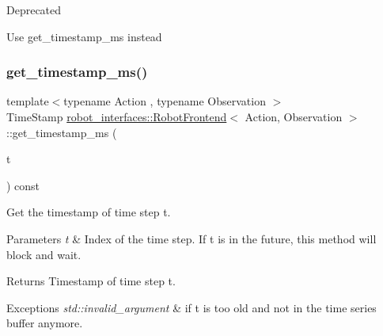 \begin{DoxyRefDesc}{Deprecated}
\item[\hyperlink{deprecated__deprecated000001}{Deprecated}]Use get\+\_\+timestamp\+\_\+ms instead \end{DoxyRefDesc}
\mbox{\label{classrobot__interfaces_1_1RobotFrontend_a6ad481cd306ea4fc2739dc9aba4cb96a}} 
\subsubsection{\texorpdfstring{get\+\_\+timestamp\+\_\+ms()}{get\_timestamp\_ms()}}
{\footnotesize\ttfamily template$<$typename Action , typename Observation $>$ \\
Time\+Stamp \hyperlink{classrobot__interfaces_1_1RobotFrontend}{robot\+\_\+interfaces\+::\+Robot\+Frontend}$<$ Action, Observation $>$\+::get\+\_\+timestamp\+\_\+ms (\begin{DoxyParamCaption}\item[{const Time\+Index \&}]{t }\end{DoxyParamCaption}) const\hspace{0.3cm}{\ttfamily [inline]}}



Get the timestamp of time step t. 


\begin{DoxyParams}{Parameters}
{\em t} & Index of the time step. If t is in the future, this method will block and wait. \\
\hline
\end{DoxyParams}
\begin{DoxyReturn}{Returns}
Timestamp of time step t. 
\end{DoxyReturn}

\begin{DoxyExceptions}{Exceptions}
{\em std\+::invalid\+\_\+argument} & if t is too old and not in the time series buffer anymore. \\
\hline
\end{DoxyExceptions}
\mbox{\label{classrobot__interfaces_1_1RobotFrontend_a8b3af92df3d5ee90beb9402e45c4745e}} 
